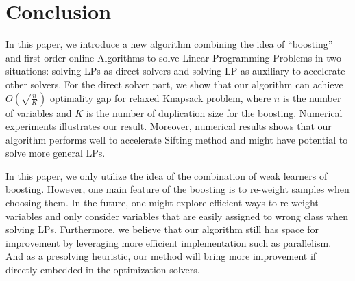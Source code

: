 \documentclass{article} %
\begin{document}
\section{Conclusion}
In this paper, we introduce a new algorithm combining the idea of ``boosting'' and first order online Algorithms to solve Linear Programming Problems in two situations: solving LPs as direct solvers and solving LP as auxiliary to accelerate other solvers. For the direct solver part, we show that our algorithm can achieve $O(\sqrt{\frac{n}{K}})$ optimality gap for relaxed Knapsack problem, where $n$ is the number of variables and $K$ is the number of duplication size for the boosting. Numerical experiments illustrates our result. Moreover, numerical results shows that our algorithm performs well to accelerate Sifting method and might have potential to solve more general LPs. 

In this paper, we only utilize the idea of the combination of weak learners of boosting. However, one main feature of the boosting is to re-weight samples when choosing them. In the future, one might explore efficient ways to re-weight variables and only consider variables that are easily assigned to wrong class when solving LPs. Furthermore, we believe that our algorithm still has space for improvement by leveraging more efficient implementation such as parallelism. And as a presolving heuristic, our method will bring more improvement if directly embedded in the optimization solvers.




%
%
%
\end{document}
